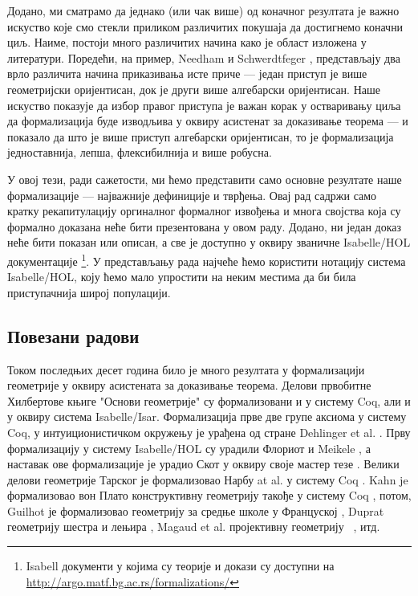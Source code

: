 Додано, ми сматрамо да једнако (или чак више) од коначног резултата је
важно искуство које смо стекли приликом различитих покушаја да
достигнемо коначни циљ. Наиме, постоји много различитих начина како је
област изложена у литератури. Поредећи, на пример, Needham
\cite{needham} и Schwerdtfeger \cite{schwerdtfeger}, представљају два
врло различита начина приказивања исте приче --- један приступ је више
геометријски оријентисан, док је други више алгебарски
оријентисан. Наше искуство показује да избор правог приступа је важан
корак у остваривању циља да формализација буде изводљива у оквиру
асистенат за доказивање теорема --- и показало да што је више приступ
алгебарски оријентисан, то је формализација једноставнија, лепша,
флексибилнија и више робусна.

У овој тези, ради сажетости, ми ћемо представити само основне
резултате наше формализације --- најважније дефиниције и тврђења. Овај
рад садржи само кратку рекапитулацију оргиналног формалног извођења и
многа својства која су формално доказана неће бити презентована у овом
раду. Додано, ни један доказ неће бити показан или описан, а све је
доступно у оквиру званичне Isabelle/HOL
документације \footnote{Isabell документи у којима су теорије и докази
  су доступни на \url{http://argo.matf.bg.ac.rs/formalizations/}}. У
представљању рада најчеће ћемо користити нотацију система
Isabelle/HOL, коју ћемо мало упростити на неким местима да би била
приступачнија широј популацији.


\subsection{Повезани радови}
\label{sec:related}

Током последњих десет година било је много резултата у формализацији
геометрије у оквиру асистената за доказивање теорема. Делови првобитне
Хилбертове књиге "Основи геометрије" \cite{hilbert} су формализовани и
у систему Coq, али и у оквиру система Isabelle/Isar. Формализација
прве две групе аксиома у систему Coq, у интуиционистичком окружењу је
урађена од стране Dehlinger et al. \cite{hilbert-coq}. Прву
формализацију у систему Isabelle/HOL су урадили Флориот и Meikele
\cite{hilbert-isabelle}, а наставак ове формализације је урадио Скот у
оквиру своје мастер тезе \cite{hilbert-scott}. Велики делови
геометрије Тарског \cite{tarski} је формализовао Нарбу at al. у
систему Coq \cite{narboux-tarski}. Kahn je формализовао вон Плато
конструктивну геометрију такође у систему Coq
\cite{vonPlato,von-plato-formalization}, потом, Guilhot је
формализовао геометрију за средње школе у Француској \cite{guilhot},
Duprat геометрију шестра и лењира \cite{ruler-compass}, Magaud et
al. пројективну геометрију ~\cite{narboux-projective}, итд.

